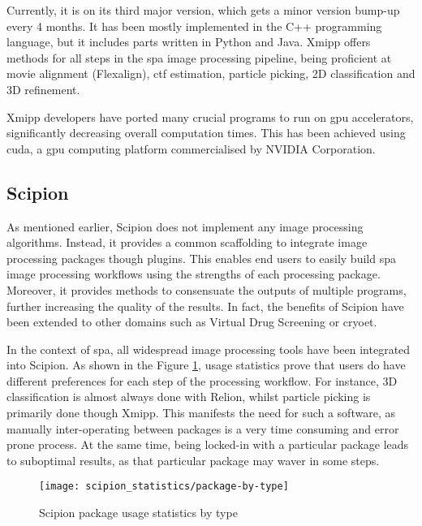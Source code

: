 \documentclass[../main.tex]{subfiles}
\begin{document}
Currently, it is on its third major version, which gets a minor version bump-up every 4 months. It has been mostly implemented in the C++ programming language, but it includes parts written in Python and Java. Xmipp offers methods for all steps in the \gls{spa} image processing pipeline, being proficient at movie alignment (Flexalign)\cite{strelak2021}, \gls{ctf} estimation, particle picking, 2D classification and 3D refinement.

Xmipp developers have ported many crucial programs to run on \gls{gpu} accelerators, significantly decreasing overall computation times. This has been achieved using \gls{cuda}, a \gls{gpu} computing platform commercialised by NVIDIA Corporation.

\subsection{Scipion}
As mentioned earlier, Scipion does not implement any image processing algorithms. Instead, it provides a common scaffolding to integrate image processing packages though plugins. This enables end users to easily build \gls{spa} image processing workflows using the strengths of each processing package. Moreover, it provides methods to consensuate the outputs of multiple programs, further increasing the quality of the results. In fact, the benefits of Scipion have been extended to other domains such as Virtual Drug Screening\cite{scipion_chem} or \gls{cryoet}\cite{jimenezdelamorena2021}.

In the context of \gls{spa}, all widespread image processing tools have been integrated into Scipion. As shown in the Figure \ref{fig:3:scipion_statistics_type}, usage statistics prove that users do have different preferences for each step of the processing workflow. For instance, 3D classification is almost always done with Relion, whilst particle picking is primarily done though Xmipp. This manifests the need for such a software, as manually inter-operating between packages is a very time consuming and error prone process. At the same time, being locked-in with a particular package leads to suboptimal results, as that particular package may waver in some steps.

\begin{figure}[htbp]
    \centering
    \texttt{[image: scipion\_statistics/package-by-type]}
    \caption{Scipion package usage statistics by type}
    \label{fig:3:scipion_statistics_type}
\end{figure}
\end{document}
